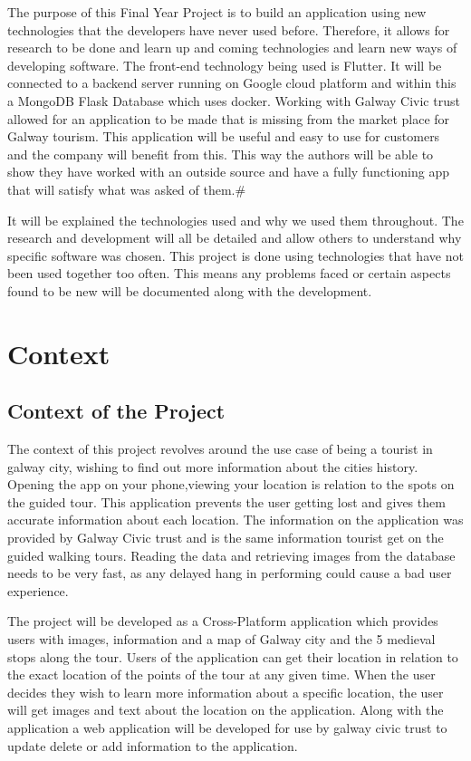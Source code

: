 The purpose of this Final Year Project is to build an application using new technologies that the developers have never used before. Therefore, it allows for research to be done and learn up and coming technologies and learn new ways of developing software. The front-end technology being used is Flutter. It will be connected to a backend server running on Google cloud platform and within this a MongoDB Flask Database which uses docker. Working with Galway Civic trust allowed for an application to be made that is missing from the market place for Galway tourism. This application will be useful and easy to use for customers and the company will benefit from this.  This way the authors will be able to show they have worked with an outside source and have a fully functioning app that will satisfy what was asked of them.#

It will be explained the technologies used and why we used them throughout. The research and development will all be detailed and allow others to understand why specific software was chosen. This project is done using technologies that have not been used together too often. This means any problems faced or certain aspects found to be new will be documented along with the development.


\section{Context}

\subsection{Context of the Project}

The context of this project revolves around the use case of being a tourist in galway city, wishing to find out more information about the cities history. Opening the app on your phone,viewing your location is relation to the spots on the guided tour. This application prevents the user getting lost and gives them accurate information about each location.  The information on the application was provided by Galway Civic trust and is the same information tourist get on the guided walking tours. Reading the data and retrieving images from the database needs to be very fast, as any delayed hang in performing could cause a bad user experience.

The project will be developed as a Cross-Platform application which provides users with images, information and a map of Galway city and the 5 medieval stops along the tour. Users of the application can get their location in relation to the exact location of the points of the tour at any given time. When the user decides they wish to learn more information about a specific location, the user will get images and text about the location on the application. Along with the application a web application will be developed for use by galway civic trust to update delete or add information to the application.

